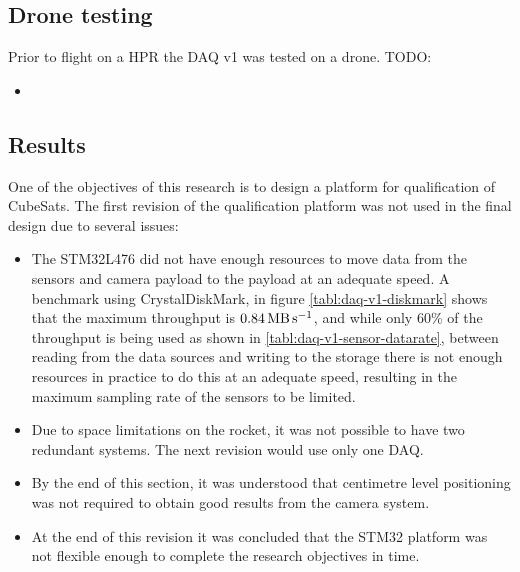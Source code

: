 \documentclass[a4paper,11pt]{article}
\begin{document}
\subsection{Drone testing}
Prior to flight on a HPR the DAQ v1 was tested on a drone.
TODO:

\begin{itemize}
  \item
\end{itemize}

\subsection{Results}

One of the objectives of this research is to design a platform for qualification of CubeSats. The first revision of the qualification platform was not used in the final design due to several issues:

\begin{itemize}
  \item The STM32L476 did not have enough resources to move data from the sensors and camera payload to the payload at an adequate speed. A benchmark using CrystalDiskMark, in figure \ref{tabl:daq-v1-diskmark} shows that the maximum throughput is $\SI{0.84}{\mega\byte\per\second}$, and while only 60\% of the throughput is being used as shown in \ref{tabl:daq-v1-sensor-datarate}, between reading from the data sources and writing to the storage there is not enough resources in practice to do this at an adequate speed, resulting in the maximum sampling rate of the sensors to be limited.
  \item Due to space limitations on the rocket, it was not possible to have two redundant systems. The next revision would use only one DAQ.
  \item By the end of this section, it was understood that centimetre level positioning was not required to obtain good results from the camera system.
  \item At the end of this revision it was concluded that the STM32 platform was not flexible enough to complete the research objectives in time.
\end{itemize}
\end{document}
